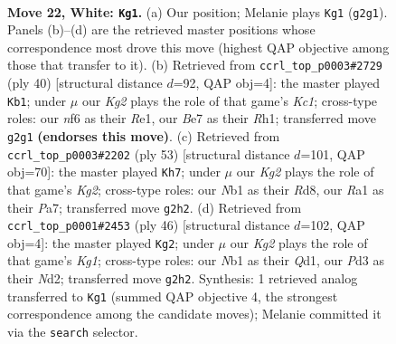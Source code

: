 \documentclass[11pt]{article}
\begin{document}
\clearpage

\begin{figure}[p]\centering
\begin{subfigure}{0.46\textwidth}\centering
\resizebox{\linewidth}{!}{%
\newchessgame
\chessboard[
  setfen={1n3rk1/4Bp2/5np1/3q3p/r1pp3P/3P2PN/4PPK1/RN2QR2 w - - 1 22},
  showmover=false,
  pgfstyle=straightmove, color=movearrow, markmove={g2-g1}
]}
\caption{}
\end{subfigure}\hfill
\begin{subfigure}{0.46\textwidth}\centering
\resizebox{\linewidth}{!}{%
\newchessgame
\chessboard[
  setfen={1r4qk/p1p4p/2np4/7P/1p1PNrp1/2P5/PPQ2PP1/2K1R2R w - - 4 21},
  showmover=false,
  pgfstyle=straightmove, color=movearrow, markmove={c1-b1}
]}
\caption{}
\end{subfigure}
\\[4pt]
\begin{subfigure}{0.46\textwidth}\centering
\resizebox{\linewidth}{!}{%
\newchessgame
\chessboard[
  setfen={2rr4/pq3pk1/4pp1p/2p5/3nP1QP/P4NP1/1P3PK1/1R2R3 b - - 2 27},
  showmover=false,
  pgfstyle=straightmove, color=movearrow, markmove={g7-h7}
]}
\caption{}
\end{subfigure}\hfill
\begin{subfigure}{0.46\textwidth}\centering
\resizebox{\linewidth}{!}{%
\newchessgame
\chessboard[
  setfen={1rr3k1/5p2/p2p1q1p/2pPn1p1/4P3/1P4P1/3N1P1P/R2QR1K1 w - - 0 24},
  showmover=false,
  pgfstyle=straightmove, color=movearrow, markmove={g1-g2}
]}
\caption{}
\end{subfigure}
\caption{\textbf{Move 22, White: \texttt{Kg1}.} (a) Our position; Melanie plays \texttt{Kg1} (\texttt{g2g1}). Panels (b)--(d) are the retrieved master positions whose correspondence most drove this move (highest QAP objective among those that transfer to it). (b) Retrieved from \texttt{ccrl\_top\_p0003\#2729} (ply 40) [structural distance $d$=92, QAP obj=4]: the master played \texttt{Kb1}; under $\mu$ our \emph{Kg2} plays the role of that game's \emph{Kc1}; cross-type roles: our \emph{n}f6 as their \emph{R}e1, our \emph{B}e7 as their \emph{R}h1; transferred move \texttt{g2g1} \textbf{(endorses this move)}. (c) Retrieved from \texttt{ccrl\_top\_p0003\#2202} (ply 53) [structural distance $d$=101, QAP obj=70]: the master played \texttt{Kh7}; under $\mu$ our \emph{Kg2} plays the role of that game's \emph{Kg2}; cross-type roles: our \emph{N}b1 as their \emph{R}d8, our \emph{R}a1 as their \emph{P}a7; transferred move \texttt{g2h2}. (d) Retrieved from \texttt{ccrl\_top\_p0001\#2453} (ply 46) [structural distance $d$=102, QAP obj=4]: the master played \texttt{Kg2}; under $\mu$ our \emph{Kg2} plays the role of that game's \emph{Kg1}; cross-type roles: our \emph{N}b1 as their \emph{Q}d1, our \emph{P}d3 as their \emph{N}d2; transferred move \texttt{g2h2}. Synthesis: 1 retrieved analog transferred to \texttt{Kg1} (summed QAP objective 4, the strongest correspondence among the candidate moves); Melanie committed it via the \texttt{search} selector.}
\label{fig:thought-m42}
\end{figure}
\end{document}
